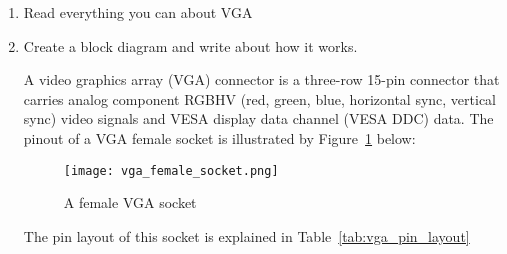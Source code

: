 \documentclass[12pt]{article}
\begin{document}
\begin{enumerate}
  \item Read everything you can about VGA
  \item Create a block diagram and write about how it works.

  A video graphics array (VGA) connector is a three-row 15-pin connector that carries analog component RGBHV (red, green, blue, horizontal sync, vertical sync) video signals and VESA display data channel (VESA DDC) data. The pinout of a VGA female socket is illustrated by Figure~\ref{fig:vga_female_socket} below:

  \begin{figure}[ht]
    \centering
    \texttt{[image: vga\_female\_socket.png]}
    \caption{A female VGA socket}
    \label{fig:vga_female_socket}
  \end{figure}

  The pin layout of this socket is explained in Table~\ref{tab:vga_pin_layout}


\end{enumerate}
\end{document}

